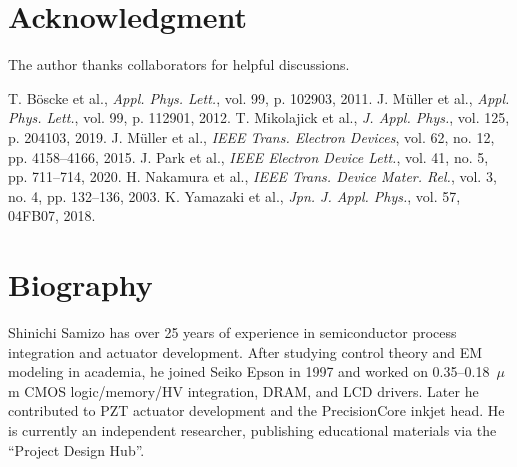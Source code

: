 \documentclass[conference]{IEEEtran}
\begin{document}
\section*{Acknowledgment}
The author thanks collaborators for helpful discussions.

\begin{thebibliography}{1}\setlength{\itemsep}{0pt plus 0.3pt}
 T. Böscke et al., \textit{Appl. Phys. Lett.}, vol. 99, p. 102903, 2011.
 J. Müller et al., \textit{Appl. Phys. Lett.}, vol. 99, p. 112901, 2012.
 T. Mikolajick et al., \textit{J. Appl. Phys.}, vol. 125, p. 204103, 2019.
 J. Müller et al., \textit{IEEE Trans. Electron Devices}, vol. 62, no. 12, pp. 4158--4166, 2015.
 J. Park et al., \textit{IEEE Electron Device Lett.}, vol. 41, no. 5, pp. 711--714, 2020.
 H. Nakamura et al., \textit{IEEE Trans. Device Mater. Rel.}, vol. 3, no. 4, pp. 132--136, 2003.
 K. Yamazaki et al., \textit{Jpn. J. Appl. Phys.}, vol. 57, 04FB07, 2018.
\end{thebibliography}

\section*{Biography}
\small
Shinichi Samizo has over 25 years of experience in semiconductor process integration and actuator development. After studying control theory and EM modeling in academia, he joined Seiko Epson in 1997 and worked on 0.35--0.18~$\mu$m CMOS logic/memory/HV integration, DRAM, and LCD drivers. Later he contributed to PZT actuator development and the PrecisionCore inkjet head. He is currently an independent researcher, publishing educational materials via the ``Project Design Hub''.
\end{document}
